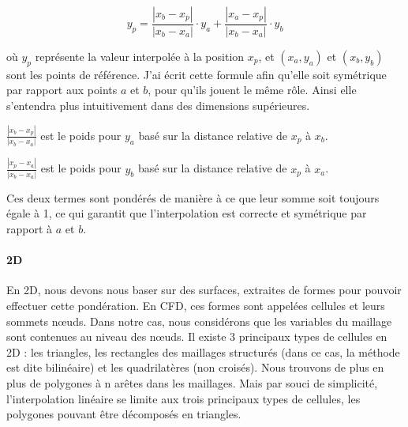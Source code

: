 \begin{equation}
y_p = \frac{|x_b - x_p|}{|x_b - x_a|} \cdot y_a + \frac{|x_a - x_p|}{|x_b - x_a|} \cdot y_b
\end{equation}

où \( y_p \) représente la valeur interpolée à la position \( x_p \), et \((x_a, y_a)\) et \((x_b, y_b)\) sont les points de référence. J'ai écrit cette formule afin qu'elle soit symétrique par rapport aux points \( a \) et \( b \), pour qu'ils jouent le même rôle. Ainsi elle s'entendra plus intuitivement dans des dimensions supérieures.
\vspace{0.5cm}

        \( \frac{|x_b - x_p|}{|x_b - x_a|} \) est le poids pour \( y_a \) basé sur la distance relative de \( x_p \) à \( x_b \).

        \( \frac{|x_p - x_a|}{|x_b - x_a|} \) est le poids pour \( y_b \) basé sur la distance relative de \( x_p \) à \( x_a \).\vspace{0.5cm}

Ces deux termes sont pondérés de manière à ce que leur somme soit toujours égale à 1, ce
qui garantit que l'interpolation est correcte et symétrique par rapport à \( a \) et \( b \).\vspace{0.5cm}

\vspace{-0.5cm}

\paragraph{2D}
\phantom{-}

En 2D, nous devons nous baser sur des surfaces, extraites de formes pour pouvoir effectuer cette pondération. En CFD, ces formes sont appelées cellules et leurs sommets nœuds. Dans notre cas, nous considérons que les variables du maillage sont contenues au niveau des nœuds. 
Il existe 3 principaux types de cellules en 2D : les triangles, les rectangles des maillages structurés (dans ce cas, la méthode est dite bilinéaire) et les quadrilatères (non croisés).
Nous trouvons de plus en plus de polygones à n arêtes dans les maillages. Mais par souci de simplicité, l'interpolation linéaire se limite aux trois principaux types de cellules, les polygones pouvant être décomposés en triangles. %

